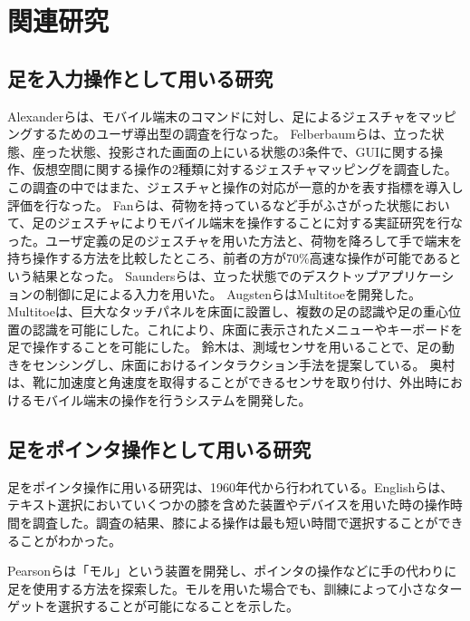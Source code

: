 \chapter{関連研究}

\section{足を入力操作として用いる研究}

Alexanderら\cite{Alexander:2012:PYB:2207676.2208575}は、モバイル端末のコマンドに対し、足によるジェスチャをマッピングするためのユーザ導出型の調査を行なった。
Felberbaumら\cite{Felberbaum:2018:BUF:3173574.3173908}は、立った状態、座った状態、投影された画面の上にいる状態の3条件で、GUIに関する操作、仮想空間に関する操作の2種類に対するジェスチャマッピングを調査した。この調査の中ではまた、ジェスチャと操作の対応が一意的かを表す指標を導入し評価を行なった。
Fanら\cite{Fan:2017:ESF:3123021.3123043}は、荷物を持っているなど手がふさがった状態において、足のジェスチャによりモバイル端末を操作することに対する実証研究を行なった。ユーザ定義の足のジェスチャを用いた方法と、荷物を降ろして手で端末を持ち操作する方法を比較したところ、前者の方が70\%高速な操作が可能であるという結果となった。
Saundersら\cite{Saunders:2016:TFI:2901790.2901815}は、立った状態でのデスクトップアプリケーションの制御に足による入力を用いた。
AugstenらはMultitoe\cite{Augsten:2010:MHI:1866029.1866064}を開発した。Multitoeは、巨大なタッチパネルを床面に設置し、複数の足の認識や足の重心位置の認識を可能にした。これにより、床面に表示されたメニューやキーボードを足で操作することを可能にした。
鈴木\cite{ssuzuki_2009}は、測域センサを用いることで、足の動きをセンシングし、床面におけるインタラクション手法を提案している。
奥村\cite{okumura_2011}は、靴に加速度と角速度を取得することができるセンサを取り付け、外出時におけるモバイル端末の操作を行うシステムを開発した。

\section{足をポインタ操作として用いる研究}
足をポインタ操作に用いる研究は、1960年代から行われている。Englishら\cite{1698228}は、テキスト選択においていくつかの膝を含めた装置やデバイスを用いた時の操作時間を調査した。調査の結果、膝による操作は最も短い時間で選択することができることがわかった。

Pearsonら\cite{Pearson:1986:MMD:22627.22392, Pearson:1988:EET:49108.1046356}は「モル」という装置を開発し、ポインタの操作などに手の代わりに足を使用する方法を探索した。モルを用いた場合でも、訓練によって小さなターゲットを選択することが可能になることを示した。


